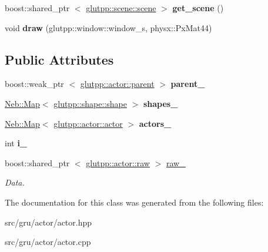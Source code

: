 \begin{DoxyCompactItemize}
\item 
\hypertarget{classglutpp_1_1actor_1_1actor_aab9c2c6a67a040eb1011685f8992d392}{boost\-::shared\-\_\-ptr\*
$<$ \hyperlink{classglutpp_1_1scene_1_1scene}{glutpp\-::scene\-::scene} $>$ {\bfseries get\-\_\-scene} ()}\label{classglutpp_1_1actor_1_1actor_aab9c2c6a67a040eb1011685f8992d392}

\item 
\hypertarget{classglutpp_1_1actor_1_1actor_afca1a4262d0f7524824d9609cffea449}{void {\bfseries draw} (glutpp\-::window\-::window\-\_\-s, physx\-::\-Px\-Mat44)}\label{classglutpp_1_1actor_1_1actor_afca1a4262d0f7524824d9609cffea449}

\end{DoxyCompactItemize}
\subsection*{\-Public \-Attributes}
\begin{DoxyCompactItemize}
\item 
\hypertarget{classglutpp_1_1actor_1_1actor_a24bf098f5c72e7eceec615c0f21a3105}{boost\-::weak\-\_\-ptr\*
$<$ \hyperlink{classglutpp_1_1actor_1_1parent}{glutpp\-::actor\-::parent} $>$ {\bfseries parent\-\_\-}}\label{classglutpp_1_1actor_1_1actor_a24bf098f5c72e7eceec615c0f21a3105}

\item 
\hypertarget{classglutpp_1_1actor_1_1actor_a184d0b5c072d4bde3b2dcccb7a07c24d}{\hyperlink{classNeb_1_1Map}{\-Neb\-::\-Map}$<$ \hyperlink{classglutpp_1_1shape_1_1shape}{glutpp\-::shape\-::shape} $>$ {\bfseries shapes\-\_\-}}\label{classglutpp_1_1actor_1_1actor_a184d0b5c072d4bde3b2dcccb7a07c24d}

\item 
\hypertarget{classglutpp_1_1actor_1_1actor_a25f1348db948dfb4e9ebc3f05fd361b7}{\hyperlink{classNeb_1_1Map}{\-Neb\-::\-Map}$<$ \hyperlink{classglutpp_1_1actor_1_1actor}{glutpp\-::actor\-::actor} $>$ {\bfseries actors\-\_\-}}\label{classglutpp_1_1actor_1_1actor_a25f1348db948dfb4e9ebc3f05fd361b7}

\item 
\hypertarget{classglutpp_1_1actor_1_1actor_a0c5f47666b646e82100781432cad37d5}{int {\bfseries i\-\_\-}}\label{classglutpp_1_1actor_1_1actor_a0c5f47666b646e82100781432cad37d5}

\item 
\hypertarget{classglutpp_1_1actor_1_1actor_a44577caf6cd53b98a2159e1f3cef3a6c}{boost\-::shared\-\_\-ptr\*
$<$ \hyperlink{classglutpp_1_1actor_1_1raw}{glutpp\-::actor\-::raw} $>$ \hyperlink{classglutpp_1_1actor_1_1actor_a44577caf6cd53b98a2159e1f3cef3a6c}{raw\-\_\-}}\label{classglutpp_1_1actor_1_1actor_a44577caf6cd53b98a2159e1f3cef3a6c}

\begin{DoxyCompactList}\small\item\em \-Data. \end{DoxyCompactList}\end{DoxyCompactItemize}


\-The documentation for this class was generated from the following files\-:\begin{DoxyCompactItemize}
\item 
src/gru/actor/actor.\-hpp\item 
src/gru/actor/actor.\-cpp\end{DoxyCompactItemize}

